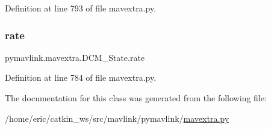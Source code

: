 Definition at line 793 of file mavextra.\+py.

\mbox{\label{classpymavlink_1_1mavextra_1_1DCM__State_a5ccb643559e6aa178a43bb8bd070458d}} 
\subsubsection{\texorpdfstring{rate}{rate}}
{\footnotesize\ttfamily pymavlink.\+mavextra.\+D\+C\+M\+\_\+\+State.\+rate}



Definition at line 784 of file mavextra.\+py.



The documentation for this class was generated from the following file\+:\begin{DoxyCompactItemize}
\item 
/home/eric/catkin\+\_\+ws/src/mavlink/pymavlink/\mbox{\hyperlink{mavextra_8py}{mavextra.\+py}}\end{DoxyCompactItemize}
